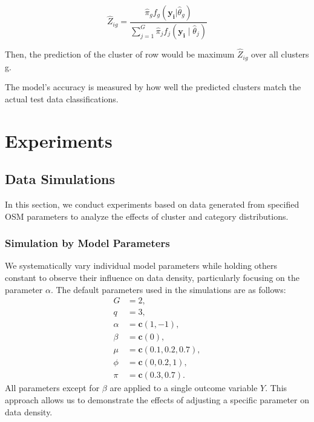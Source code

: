 \documentclass{article}
\begin{document}

\begin{equation}
  \hat{Z}_{ig} = \frac{\hat{\pi}_g f_g(\mathbf{y_i}|\hat{\theta}_g)}{\sum_{j=1}^{G} \hat{\pi}_j f_j(\mathbf{y_i} \mid \hat{\theta}_j)}
\end{equation}

Then, the prediction of the cluster of row would be maximum $\hat{Z}_{ig}$ over all clusters g.

The model's accuracy is measured by how well the predicted clusters match the actual test data classifications.

\section{Experiments}

\subsection{Data Simulations}

In this section, we conduct experiments based on data generated from specified OSM parameters to analyze the effects of cluster and category distributions.

\subsubsection{Simulation by Model Parameters}
We systematically vary individual model parameters while holding others constant to observe their influence on data density, particularly focusing on the parameter $\alpha$. The default parameters used in the simulations are as follows:
\[
\begin{aligned}
G &= 2, \\
q &= 3, \\
\alpha &= \mathbf{c}(1, -1), \\
\beta &= \mathbf{c}(0), \\
\mu &= \mathbf{c}(0.1, 0.2, 0.7), \\
\phi &= \mathbf{c}(0, 0.2, 1), \\
\pi &= \mathbf{c}(0.3, 0.7).
\end{aligned}
\]
All parameters except for $\beta$ are applied to a single outcome variable $Y$. This approach allows us to demonstrate the effects of adjusting a specific parameter on data density.
\end{document}
